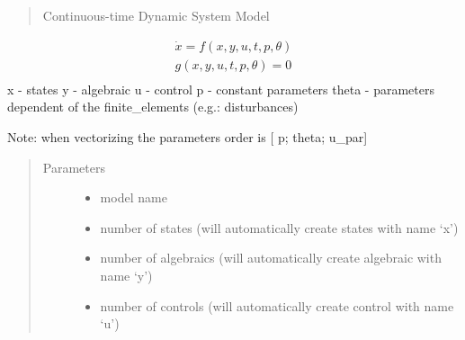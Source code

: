 \documentclass[letterpaper,10pt,english]{sphinxmanual}
\begin{document}
\begin{fulllineitems}
\label{\detokenize{yaocptool.modelling:yaocptool.modelling.system_model.SystemModel}}~

\begin{fulllineitems}
\label{\detokenize{yaocptool.modelling:yaocptool.modelling.system_model.SystemModel.__init__}}~\begin{quote}

Continuous-time Dynamic System Model
\end{quote}
\begin{equation*}
\begin{split}\dot{x} = f(x,y,u,t,p,\theta) \\
g(x,y,u,t,p,\theta) = 0\\\end{split}
\end{equation*}
x - states
y - algebraic
u - control
p - constant parameters
theta - parameters dependent of the finite\_elements (e.g.: disturbances)

Note: when vectorizing the parameters order is {[} p; theta; u\_par{]}
\begin{quote}\begin{description}
\item[{Parameters}] \leavevmode\begin{itemize}
\item {} 
 \textendash{} model name

\item {} 
 \textendash{} number of states (will automatically create states with name ‘x’)

\item {} 
 \textendash{} number of algebraics (will automatically create algebraic with name ‘y’)

\item {} 
 \textendash{} number of controls (will automatically create control with name ‘u’)


\end{itemize}
\end{description}
\end{quote}
\end{fulllineitems}
\end{fulllineitems}
\end{document}
